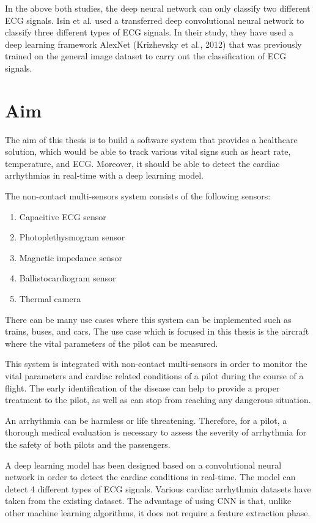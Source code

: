 In the above both studies, the deep neural network can only classify two different ECG signals. Isin et al. \cite{Isin2017268} used a transferred deep convolutional neural network to classify three different types of ECG signals. In their study, they have used a deep learning framework AlexNet (Krizhevsky et al., 2012) that was previously trained on the general image dataset to carry out the classification of ECG signals. 

\section{Aim}

The aim of this thesis is to build a software system that provides a healthcare solution, which would be able to track various vital signs such as heart rate, temperature, and ECG. Moreover, it should be able to detect the cardiac arrhythmias in real-time with a deep learning model.

The non-contact multi-sensors system consists of the following sensors:


\begin{enumerate}
	\item Capacitive ECG sensor
	\item Photoplethysmogram sensor
	\item Magnetic impedance sensor
	\item Ballistocardiogram sensor
	\item Thermal camera
\end{enumerate}


There can be many use cases where this system can be implemented such as trains, buses, and cars. The use case which is focused in this thesis is the aircraft where the vital parameters of the pilot can be measured.

This system is integrated with non-contact multi-sensors in order to monitor the vital parameters and cardiac related conditions of a pilot during the course of a flight. The early identification of the disease can help to provide a proper treatment to the pilot, as well as can stop from reaching any dangerous situation.

An arrhythmia can be harmless or life threatening. Therefore, for a pilot, a thorough medical evaluation is necessary to assess the severity of arrhythmia for the safety of both pilots and the passengers.

A deep learning model has been designed based on a convolutional neural network in order to detect the cardiac conditions in real-time. The model can detect 4 different types of ECG signals. Various cardiac arrhythmia datasets have taken from the existing dataset. The advantage of using CNN is that, unlike other machine learning algorithms, it does not require a feature extraction phase.

